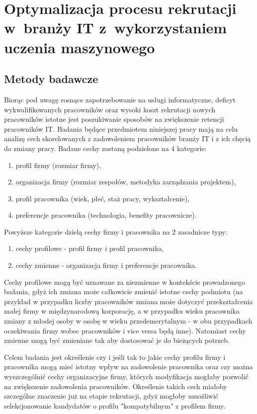 \chapter{Optymalizacja procesu rekrutacji w~branży IT z~wykorzystaniem uczenia maszynowego}\label{ch:analysis}
\section{Metody badawcze}\label{sec:analysis-method}
Biorąc pod uwagę rosnące zapotrzebowanie na usługi informatyczne, deficyt wykwalifikowanych pracowników \cite{daxx-2021} oraz wysoki koszt rekrutacji nowych pracowników \cite{hairing-dev-2021} istotne jest poszukiwanie sposobów na zwiększenie retencji pracowników IT.
Badania będące przedmiotem niniejszej pracy mają na celu analizę cech skorelowanych z zadowoleniem pracowników branży IT i z ich chęcią do zmiany pracy.
Badane cechy zostaną podzielone na 4 kategorie:
\begin{enumerate}
    \item profil firmy (rozmiar firmy),
    \item organizacja firmy (rozmiar zespołów, metodyka zarządzania projektem),
    \item profil pracownika (wiek, płeć, staż pracy, wykształcenie),
    \item preferencje pracownika (technologia, benefity pracownicze).
    \end{enumerate}

Powyższe kategorie dzielą cechy firmy i pracownika na 2 zasadnicze typy:
\begin{enumerate}
    \item cechy profilowe - profil firmy i profil pracownika,
    \item cechy zmienne - organizacja firmy i preferencje pracownika.
    \end{enumerate}

Cechy profilowe mogą być uznawane za niezmienne w kontekście prowadzonego badania, gdyż ich zmiana może całkowicie zmienić istotne cechy podmiotu
(na przykład w przypadku liczby pracowników zmiana może dotyczyć przekształcenia małej firmy w międzynarodową korporację, a w przypadku wieku pracownika zmiany z młodej osoby w osobę w wieku przedemerytalnym - w obu przypadkach oczekiwania firmy wobec pracowników i vice versa będą inne).
Natomiast cechy zmienne mogą być zmieniane tak aby dostosować je do bieżących potrzeb.

Celem badania jest określenie czy i jeśli tak to jakie cechy profilu firmy i pracownika mogą mieć istotny wpływ na zadowolenie pracownika
oraz czy można wyszczególnić cechy organizacyjne firmy, których modyfikacja mogłaby pozwolić na zwiększenie zadowolenia pracowników.
Określenie takich cech miałoby szczególne znaczenie już na etapie rekrutacji, gdyż mogłoby umożliwić selekcjonowanie kandydatów o profilu "kompatybilnym" z profilem firmy.


